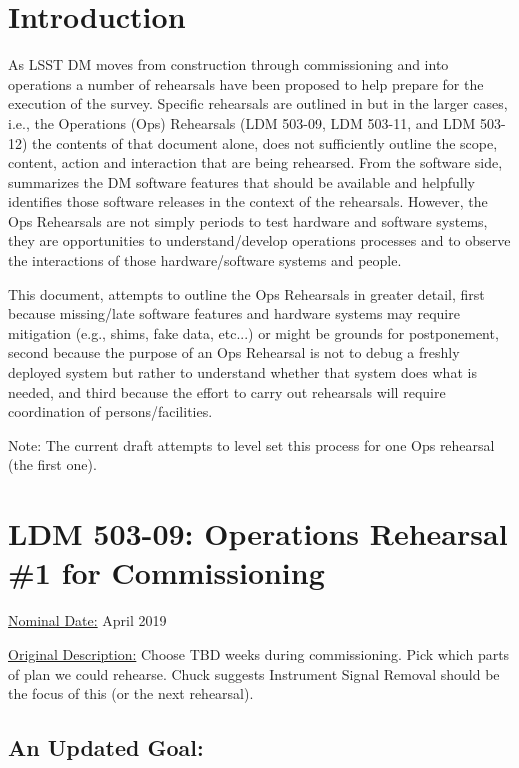 
\section{Introduction}

As LSST DM moves from construction through commissioning and into operations 
a number of rehearsals have been proposed to help prepare for the execution 
of the survey.  Specific rehearsals are outlined in  but in 
the larger cases, i.e., the Operations (Ops) Rehearsals (LDM 503-09, LDM 503-11, and 
LDM 503-12) the contents of that document alone, does not sufficiently outline 
the scope, content, action and interaction that are being rehearsed.  
From the software side, 
summarizes the DM software features that should be available and helpfully 
identifies those software releases in the context of the rehearsals.  
However, the Ops Rehearsals are not simply periods to test hardware and 
software systems, they are opportunities to understand/develop operations 
processes and to observe the interactions of those hardware/software systems 
and people. 

This document, attempts to outline the Ops Rehearsals in greater detail, 
first because missing/late software features and hardware systems may 
require mitigation (e.g., shims, fake data, etc...) or might be grounds for 
postponement, second because the purpose of an Ops Rehearsal is not to debug 
a freshly deployed system but rather to understand whether that system does
what is needed, and third because the effort to carry out rehearsals will 
require coordination of persons/facilities. 

Note: The current draft attempts to level set this process for one Ops 
rehearsal (the first one).


\section{LDM 503-09: Operations Rehearsal \#1 for Commissioning}

\underline{Nominal Date:} April 2019

\underline{Original Description:}
Choose TBD weeks during commissioning. Pick which parts of plan we could 
rehearse.  Chuck suggests Instrument Signal Removal should be the focus 
of this (or the next rehearsal).

\clearpage

\subsection{An Updated Goal:}

